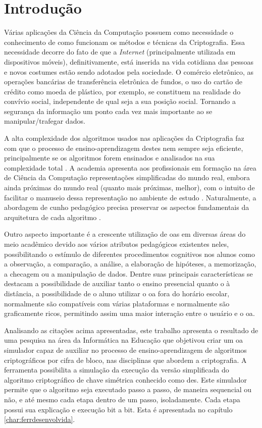 \chapter{Introdução}
\label{char:intro}
Várias aplicações da Ciência da Computação possuem como necessidade o conhecimento de como funcionam os métodos e técnicas da Criptografia. Essa necessidade decorre do fato de que a \textit{Internet} (principalmente utilizada em dispositivos móveis), definitivamente, está inserida na vida cotidiana das pessoas e novos costumes estão sendo adotados pela sociedade. O comércio eletrônico, as operações bancárias de transferência eletrônica de fundos, o uso do cartão de crédito como moeda de plástico, por exemplo, se constituem na realidade do convívio social, independente de qual seja a sua posição social. Tornando a segurança da informação um ponto cada vez mais importante ao se manipular/trafegar dados.\cite{silva09} \cite{silva12}

A alta complexidade dos algoritmos usados nas aplicações da Criptografia faz com que o processo de ensino-aprendizagem destes nem sempre seja eficiente, principalmente se os algoritmos forem ensinados e analisados na sua complexidade total \cite{silva09} \cite{silva12}. A academia apresenta aos profissionais em formação na área de Ciência da Computação representações simplificadas do mundo real, embora ainda próximas do mundo real (quanto mais próximas, melhor), com o intuito de facilitar o manuseio dessa representação no ambiente de estudo \cite{maia01} \cite{maia03} \cite{kioki08}. Naturalmente, a abordagem de cunho pedagógico precisa preservar os aspectos fundamentais da arquitetura de cada algoritmo \cite{garmpis11} \cite{lopes12}.

Outro aspecto importante é a crescente utilização de \acrfull{oas} em diversas áreas do meio acadêmico devido aos vários atributos pedagógicos existentes neles, possibilitando o estímulo de diferentes procedimentos cognitivos nos alunos como a observação, a comparação, a análise, a elaboração de hipóteses, a memorização, a checagem ou a manipulação de dados. Dentre suas principais características se destacam a possibilidade de auxiliar tanto o ensino presencial quanto o à distância, a possibilidade de o aluno utilizar o \acrshort{oa} fora do horário escolar, normalmente são compatíveis com várias plataformas e normalmente são graficamente ricos, permitindo assim uma maior interação entre o usuário e o \acrshort{oa}. \cite{barbosa15}

Analisando as citações acima apresentadas, este trabalho apresenta o resultado de uma pesquisa na área da Informática na Educação que objetivou criar um \acrshort{oa} simulador capaz de auxiliar no processo de ensino-aprendizagem de algoritmos criptográficos por cifra de bloco, nas disciplinas que abordem a criptografia. A ferramenta possibilita a simulação da execução da versão simplificada do algoritmo criptográfico de chave simétrica conhecido como \acrfull{des}. Este simulador permite que o algoritmo seja executado passo a passo, de maneira sequencial ou não, e até mesmo cada etapa dentro de um passo, isoladamente. Cada etapa possui sua explicação e execução bit a bit. Esta é apresentada no capítulo \ref{char:ferrdesenvolvida}.

